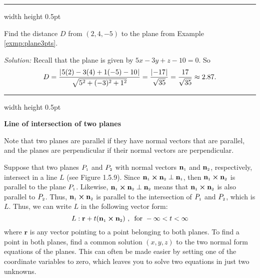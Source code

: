 \hrule width \textwidth height 0.5pt
\begin{exmp}\label{exmp:distptplane}
 Find the distance $D$ from $(2,4,-5)$ to the plane from Example \ref{exmp:plane3pts}.\smallskip
 \par\noindent\emph{Solution:} Recall that the plane is given by $5x - 3y + z - 10 = 0$. So
 \begin{displaymath}
  D = \frac{\lvert\mspace{1mu}5(2) - 3(4) + 1(-5) - 10\mspace{1mu}\rvert}{\sqrt{5^2 + (-3)^2 + 1^2}} = \frac{\lvert\mspace{1mu}-17\mspace{1mu}\rvert}{\sqrt{35}} =
   \frac{17}{\sqrt{35}} \approx 2.87.
 \end{displaymath}
\end{exmp}
\hrule width \textwidth height 0.5pt
\pagebreak[3]
\par\noindent\textbf{\large{Line of intersection of two planes}}\normalsize\smallskip

\piccaption[]{}
Note that two planes are parallel if they have normal vectors that are parallel, and the planes are perpendicular if
their normal vectors are perpendicular. 

Suppose
that two planes $P_{\scriptscriptstyle 1}$ and $P_{\scriptscriptstyle 2}$ with normal vectors $\mathbf{n}_{\scriptscriptstyle 1}$ and $\mathbf{n}_{\scriptscriptstyle 2}$,
respectively, intersect in a line $L$ (see Figure 1.5.9). 
Since $\mathbf{n}_{\scriptscriptstyle 1} \bm{\times} \mathbf{n}_{\scriptscriptstyle 2} \perp
\mathbf{n}_{\scriptscriptstyle 1}$, then $\mathbf{n}_{\scriptscriptstyle 1} \bm{\times} \mathbf{n}_{\scriptscriptstyle 2}$ is parallel to the plane
$P_{\scriptscriptstyle 1}$. 
Likewise, $\mathbf{n}_{\scriptscriptstyle 1} \bm{\times} \mathbf{n}_{\scriptscriptstyle 2} \perp \mathbf{n}_{\scriptscriptstyle 2}$ means
that $\mathbf{n}_{\scriptscriptstyle 1} \bm{\times} \mathbf{n}_{\scriptscriptstyle 2}$ is also parallel to $P_{\scriptscriptstyle 2}$. 
Thus,
$\mathbf{n}_{\scriptscriptstyle 1} \bm{\times} \mathbf{n}_{\scriptscriptstyle 2}$ is parallel to the intersection of $P_{\scriptscriptstyle 1}$ and
$P_{\scriptscriptstyle 2}$, which is $L$. 
Thus, we can
write $L$ in the following vector form:
\begin{equation}
 L: \mathbf{r} + t(\mathbf{n}_{\scriptscriptstyle 1} \bm{\times} \mathbf{n}_{\scriptscriptstyle 2}) \text{~,~~for~} -\infty < t < \infty
\end{equation}
where $\mathbf{r}$ is any vector pointing to a point belonging to both planes. To find a point in both planes,
find a common solution $(x,y,z)$ to the two normal form equations of the planes. 
This can often be made easier
by setting one of the coordinate variables to zero, which leaves you to solve two equations in just two unknowns.

